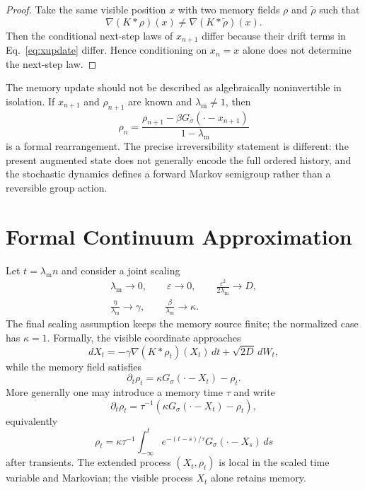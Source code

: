 \documentclass[preprint,amsmath,amssymb,aps,prd,nofootinbib,floatfix]{revtex4-2}
\begin{document}
\begin{proof}
Take the same visible position $x$ with two memory fields $\rho$ and
$\tilde\rho$ such that
\[
\nabla(K*\rho)(x)\neq\nabla(K*\tilde\rho)(x).
\]
Then the conditional next-step laws of $x_{n+1}$ differ because their drift
terms in Eq.~\eqref{eq:xupdate} differ. Hence conditioning on $x_n=x$ alone
does not determine the next-step law.
\end{proof}

The memory update should not be described as algebraically noninvertible in
isolation. If $x_{n+1}$ and $\rho_{n+1}$ are known and $\lambda_{\mathrm m}\neq1$, then
\[
\rho_n=\frac{\rho_{n+1}-\beta G_\sigma(\cdot-x_{n+1})}{1-\lambda_{\mathrm m}}
\]
is a formal rearrangement. The precise irreversibility statement is different:
the present augmented state does not generally encode the full ordered
history, and the stochastic dynamics defines a forward Markov semigroup rather
than a reversible group action.

\section{Formal Continuum Approximation}

Let $t=\lambda_{\mathrm m} n$ and consider a joint scaling
\[
\begin{gathered}
\lambda_{\mathrm m}\to0,\qquad \varepsilon\to0,\qquad
\frac{\varepsilon^2}{2\lambda_{\mathrm m}}\to D,\\
\frac{\eta}{\lambda_{\mathrm m}}\to\gamma,
\qquad \frac{\beta}{\lambda_{\mathrm m}}\to\kappa.
\end{gathered}
\]
The final scaling assumption keeps the memory source finite; the normalized
case has $\kappa=1$. Formally, the visible coordinate approaches
\begin{equation}
dX_t=-\gamma\nabla(K*\rho_t)(X_t)\,dt+\sqrt{2D}\,dW_t,
\label{eq:sde}
\end{equation}
while the memory field satisfies
\begin{equation}
\partial_t\rho_t=\kappa G_\sigma(\cdot-X_t)-\rho_t.
\label{eq:memoryode}
\end{equation}
More generally one may introduce a memory time $\tau$ and write
\[
\partial_t\rho_t=\tau^{-1}\left(\kappa G_\sigma(\cdot-X_t)-\rho_t\right),
\]
equivalently
\[
\rho_t=\kappa\tau^{-1}\int_{-\infty}^{t}e^{-(t-s)/\tau}
G_\sigma(\cdot-X_s)\,ds
\]
after transients. The extended process $(X_t,\rho_t)$ is local in the scaled
time variable and Markovian; the visible process $X_t$ alone retains memory.
\end{document}
